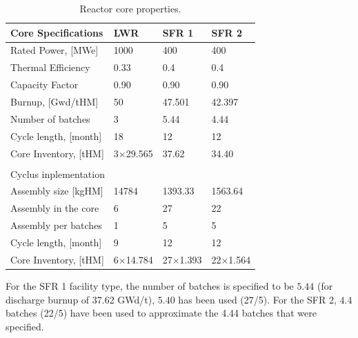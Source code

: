 \documentclass[12pt]{article}
\begin{document}
\begin{table}[h!]
    \centering
    \begin{tabularx}{350pt}{lXXX}
      \hline
      Core Specifications   &  LWR             &  SFR 1            &  SFR 2            \\
      \hline
      Rated Power, [MWe]    &  1000            &  400              &  400              \\
      Thermal Efficiency    &  0.33            &  0.4              &  0.4              \\
      Capacity Factor       &  0.90            &  0.90             &  0.90             \\
      Burnup, [Gwd/tHM]     &  50              &  47.501           &  42.397           \\
      Number of batches     &  3               &  5.44             &  4.44             \\
      Cycle length, [month] &  18              &  12               &  12               \\
      Core Inventory, [tHM] &  3$\times$29.565 &  37.62            &  34.40            \\
                                                                                       \\
      \multicolumn{4}{l}{Cyclus inplementation}                                        \\ 
      \hline
      \hline
      Assembly size [kgHM]  &  14784           &  1393.33          &  1563.64          \\
      Assembly in the core  &  6               &  27               &  22               \\
      Assembly per batches  &  1               &  5                &  5                \\
      Cycle length, [month] &  9               &  12               &  12               \\
      Core Inventory, [tHM] &  6$\times$14.784 &  27$\times$1.393  &  22$\times$1.564  \\
      \hline
    \end{tabularx}
    \caption{Reactor core properties.}
    \label{tab:reactor}
\end{table}


For the SFR 1 facility type, the number of batches is specified to be $5.44$ (for
discharge burnup of 37.62 GWd/t), $5.40$ has been used (27/5). For the SFR 2, $4.4$ 
batches (22/5) have been used to approximate the 4.44 batches that were specified.
\end{document}
